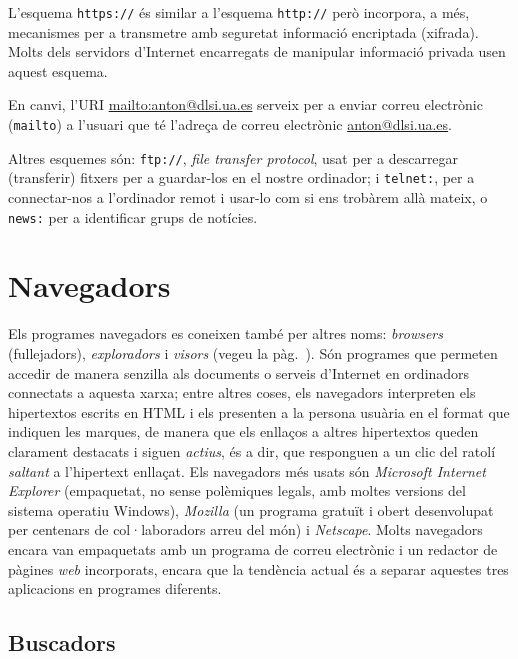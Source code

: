   L'esquema {\tt https://} és similar a l'esquema {\tt http://} però
  incorpora, a més, mecanismes per a transmetre amb seguretat
  informació encriptada (xifrada). Molts dels servidors d'Internet
  encarregats de manipular informació privada usen aquest esquema.


En canvi, l'URI \url{mailto:anton@dlsi.ua.es} serveix 
per a enviar correu
electrònic ({\tt mailto}) a l'usuari que té l'adreça de
correu electrònic \url{anton@dlsi.ua.es}.

Altres esquemes són: {\tt ftp://}, \emph{file transfer protocol},
usat per a descarregar (transferir) fitxers per a guardar-los en el
nostre ordinador\label{pg:ftp}; i {\tt telnet:}, per a connectar-nos a
l'ordinador remot i usar-lo com si ens trobàrem allà mateix, o
{\tt news:} per a identificar grups de notícies.

\section{Navegadors}
\label{ss:navegadors}
Els programes navegadors es coneixen també per altres noms: {\em
  browsers} (fullejadors), \emph{exploradors} i \emph{visors} (vegeu
la pàg.~\pageref{pg:navegadors}).  Són programes que permeten accedir
de manera senzilla als documents o serveis d'Internet en ordinadors
connectats a aquesta xarxa; entre altres coses, els navegadors
interpreten els hipertextos escrits en HTML i els presenten a la
persona usuària en el format que indiquen les marques, de manera que
els enllaços a altres hipertextos queden clarament destacats i siguen
\emph{actius}, és a dir, que responguen a un clic del ratolí
\emph{saltant} a l'hipertext enllaçat.  Els navegadors més usats
són \emph{Microsoft Internet Explorer} (empaquetat, no sense
polèmiques legals, amb moltes versions del sistema operatiu Windows),
\emph{Mozilla} (un programa gratuït i obert desenvolupat per centenars
de col·laboradors arreu del món) i \emph{Netscape}.  Molts navegadors
encara van empaquetats amb un programa de correu electrònic i un
redactor de pàgines \emph{web} incorporats, encara que la tendència
actual és a separar aquestes tres aplicacions en programes
diferents.
 

\subsection{Buscadors}

